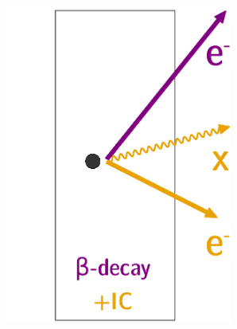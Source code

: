 \begin{figure}[!h]
\centering
\begin{subfigure}[t]{0.32\textwidth}
  \centering
  \includegraphics[width=0.82\textwidth]{SNdemonstrator/fig_SNdemonstrator/internal_contamination_IC.pdf}
  \captionsetup{justification=justified}
  \caption{
    \label{subfig:int_cont_IC}}
\end{subfigure}
\hfill
\begin{subfigure}[t]{0.32\textwidth}
  \centering

\end{subfigure}
\end{figure}
